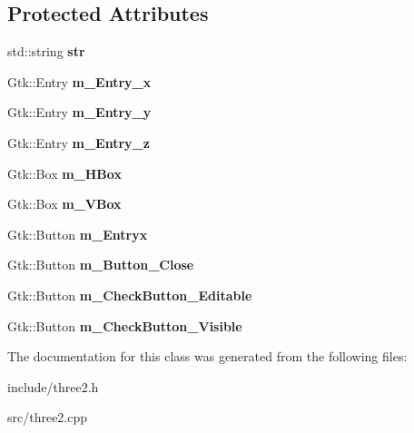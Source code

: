 \subsection*{Protected Attributes}
\begin{DoxyCompactItemize}
\item 
\mbox{\label{class_three2_adb620701a366dd07844ff4abf17258fe}} 
std\+::string {\bfseries str}
\item 
\mbox{\label{class_three2_aff82a29f9642dc60a115239a0f4cf60b}} 
Gtk\+::\+Entry {\bfseries m\+\_\+\+Entry\+\_\+x}
\item 
\mbox{\label{class_three2_a6b30657ba69e00e4076162e01508ab75}} 
Gtk\+::\+Entry {\bfseries m\+\_\+\+Entry\+\_\+y}
\item 
\mbox{\label{class_three2_a7d4915ccab1dd3f674cbf456d0fa04bc}} 
Gtk\+::\+Entry {\bfseries m\+\_\+\+Entry\+\_\+z}
\item 
\mbox{\label{class_three2_a96d6bac53e30b6334ebf1cd9cc1e2c32}} 
Gtk\+::\+Box {\bfseries m\+\_\+\+H\+Box}
\item 
\mbox{\label{class_three2_a9bb049ab7acee838199ca05fdd2a7fd0}} 
Gtk\+::\+Box {\bfseries m\+\_\+\+V\+Box}
\item 
\mbox{\label{class_three2_ac424c74203936118ce87aed55c7bce12}} 
Gtk\+::\+Button {\bfseries m\+\_\+\+Entryx}
\item 
\mbox{\label{class_three2_a841fa40683ff4f327693d41c34ad83b5}} 
Gtk\+::\+Button {\bfseries m\+\_\+\+Button\+\_\+\+Close}
\item 
\mbox{\label{class_three2_aed3d315fbf91b4cb9c02e5ead67608bc}} 
Gtk\+::\+Button {\bfseries m\+\_\+\+Check\+Button\+\_\+\+Editable}
\item 
\mbox{\label{class_three2_af51862b8e6bc0529ca980da25ca19977}} 
Gtk\+::\+Button {\bfseries m\+\_\+\+Check\+Button\+\_\+\+Visible}
\end{DoxyCompactItemize}


The documentation for this class was generated from the following files\+:\begin{DoxyCompactItemize}
\item 
include/three2.\+h\item 
src/three2.\+cpp\end{DoxyCompactItemize}
